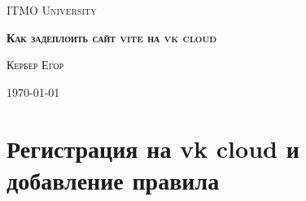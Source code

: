 \documentclass[14pt, a4paper]{extarticle}
\begin{document}
\begin{titlepage}
    \centering
    \par
    {\scshape ITMO University\par}
    \vspace{80mm}
    {\Large\bfseries\scshape Как задеплоить сайт vite на vk cloud\par}
    \vspace{20mm}
    {\scshape Кербер Егор\par}
    \vfill
    {\scshape\today\par}
\end{titlepage}

\setcounter{page}{2}
\tableofcontents
\newpage

\section{Регистрация на vk cloud и добавление правила}
\end{document}

